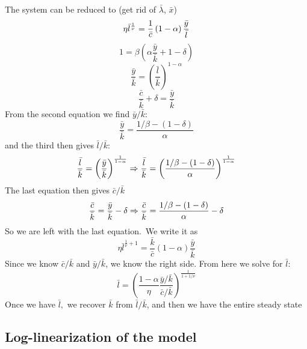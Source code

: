 \documentclass[12pt]{article}
\begin{document}
The system can be reduced to (get rid of $\bar{\lambda}$, $\bar{x}$)%
\begin{equation*}
\eta \bar{l}^{\frac{1}{\nu }}=\frac{1}{\bar{c}}\left( 1-\alpha \right) \frac{%
\bar{y}}{\bar{l}}
\end{equation*}%
\begin{equation*}
1=\beta \left( \alpha \frac{\bar{y}}{\bar{k}}+1-\delta \right) 
\end{equation*}%
\begin{equation*}
\frac{\bar{y}}{\bar{k}}=\left( \frac{\bar{l}}{\bar{k}}\right) ^{1-\alpha }
\end{equation*}%
\begin{equation*}
\frac{\bar{c}}{\bar{k}}+\delta =\frac{\bar{y}}{\bar{k}}
\end{equation*}%
From the second equation we find $\bar{y}/\bar{k}:$%
\begin{equation*}
\frac{\bar{y}}{\bar{k}}=\frac{1/\beta -\left( 1-\delta \right) }{\alpha }
\end{equation*}%
and the third then gives $\bar{l}/\bar{k}:$%
\begin{equation*}
\frac{\bar{l}}{\bar{k}}=\left( \frac{\bar{y}}{\bar{k}}\right) ^{\frac{1}{%
1-\alpha }}\Rightarrow \frac{\bar{l}}{\bar{k}}=\left( \frac{1/\beta -\left(
1-\delta \right) }{\alpha }\right) ^{\frac{1}{1-\alpha }}
\end{equation*}%
The last equation then gives $\bar{c}/\bar{k}$%
\begin{equation*}
\frac{\bar{c}}{\bar{k}}=\frac{\bar{y}}{\bar{k}}-\delta \Rightarrow \frac{%
\bar{c}}{\bar{k}}=\frac{1/\beta -\left( 1-\delta \right) }{\alpha }-\delta 
\end{equation*}%
So we are left with the last equation.\ We write it as%
\begin{equation*}
\eta \bar{l}^{\frac{1}{\nu }+1}=\frac{\bar{k}}{\bar{c}}\left( 1-\alpha
\right) \frac{\bar{y}}{\bar{k}}
\end{equation*}%
Since we know $\bar{c}/\bar{k}$ and $\bar{y}/\bar{k}$, we know the right
side. From here we solve for $\bar{l}:$%
\begin{equation}
\bar{l}=\left( \frac{1-\alpha }{\eta }\frac{\bar{y}/\bar{k}}{\bar{c}/\bar{k}}%
\right) ^{\frac{1}{1+1/\nu }}  \label{lbar}
\end{equation}%
Once we have $\bar{l},$ we recover $\bar{k}$ from $\bar{l}/\bar{k}$, and
then we have the entire steady state

\subsection{Log-linearization of the model}
\end{document}
